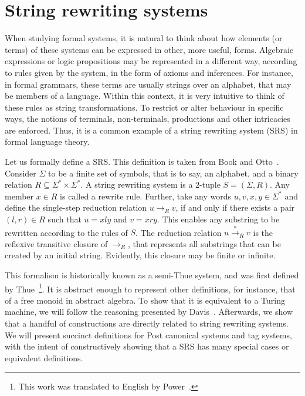 \documentclass[12pt]{article}
\begin{document}
\section{String rewriting systems}\label{sec:srs}

When studying formal systems, it is natural to think about how elements (or
terms) of these systems can be expressed in other, more useful, forms.
Algebraic expressions or logic propositions may be represented in a different
way, according to rules given by the system, in the form of axioms and
inferences. For instance, in formal grammars, these terms are usually strings
over an alphabet, that may be members of a language. Within this context, it is
very intuitive to think of these rules as string transformations. To restrict
or alter behaviour in specific ways, the notions of terminals, non-terminals,
productions and other intricacies are enforced. Thus, it is a common example of
a string rewriting system (SRS) in formal language theory.

Let us formally define a SRS\@. This definition is taken from Book and
Otto~\cite[Sec. 2.1]{Book:book:1993}. Consider $\Sigma$ to be a finite set of
symbols, that is to say, an alphabet, and a binary relation $R \subseteq
\Sigma^{*} \times \Sigma^{*}$. A string rewriting system is a $2$-tuple $S =
(\Sigma, R)$. Any member $x \in R$ is called a rewrite rule. Further, take any
words $u, v, x, y \in \Sigma^{*}$ and define the single-step reduction relation
$u \rightarrow_{R} v$, if and only if there exists a pair $(l, r) \in R$ such
that $u = xly$ and $v = xry$. This enables any substring to be rewritten
according to the rules of $S$. The reduction relation $u
\stackrel{*}{\rightarrow}_{R} v$ is the reflexive transitive closure of
$\rightarrow_{R}$, that represents all substrings that can be created by an
initial string. Evidently, this closure may be finite or infinite.

This formalism is historically known as a semi-Thue system, and was first
defined by Thue~\cite{Thue:article:1914:may}\footnote{This work was translated
to English by Power~\cite{Power:misc:2013:aug}.}. It is abstract enough to
represent other definitions, for instance, that of a free monoid in abstract
algebra. To show that it is equivalent to a Turing machine, we will follow the
reasoning presented by Davis~\cite{Davis:book:1958}. Afterwards, we show that a
handful of constructions are directly related to string rewriting systems. We
will present succinct definitions for Post canonical systems and tag systems,
with the intent of constructively showing that a SRS has many special cases or
equivalent definitions.
\end{document}
